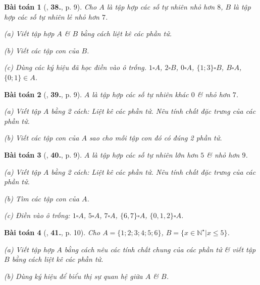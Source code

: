 \documentclass{article}
\numberwithin{equation}{section}
\newtheorem{baitoan}{Bài toán}[section]
\begin{document}
\begin{baitoan}[\cite{Trong_Toan_6_2021}, \textbf{38.}, p. 9]
	Cho $A$ là tập hợp các số tự nhiên nhỏ hơn $8$, $B$ là tập hợp các số tự nhiên lẻ nhỏ hơn $7$.
	\begin{enumerate*}
		\item[(a)] Viết tập hợp $A$ \& $B$ bằng cách liệt kê các phần tử.
		\item[(b)] Viết các tập con của $B$.
		\item[(c)] Dùng các ký hiệu đã học điền vào ô trống. $1\square A$, $2\square B$, $0\square A$, $\{1;3\}\square B$, $B\square A$, $\{0;1\}\in A$.
	\end{enumerate*}
\end{baitoan}

\begin{baitoan}[\cite{Trong_Toan_6_2021}, \textbf{39.}, p. 9]
	$A$ là tập hợp các số tự nhiên khác $0$ \& nhỏ hơn $7$.
	\begin{enumerate*}
		\item[(a)] Viết tập $A$ bằng 2 cách: Liệt kê các phần tử. Nêu tính chất đặc trưng của các phần tử.
		\item[(b)] Viết các tập con của $A$ sao cho mỗi tập con đó có đúng 2 phần tử.
	\end{enumerate*}
\end{baitoan}

\begin{baitoan}[\cite{Trong_Toan_6_2021}, \textbf{40.}, p. 9]
	$A$ là tập hợp các số tự nhiên lớn hơn $5$ \& nhỏ hơn $9$.
	\begin{enumerate*}
		\item[(a)] Viết tập $A$ bằng 2 cách: Liệt kê các phần tử. Nêu tính chất đặc trưng của các phần tử.
		\item[(b)] Tìm các tập con của $A$.
		\item[(c)] Điền vào ô trống: $1\square A$, $5\square A$, $7\square A$, $\{6,7\}\square A$, $\{0,1,2\}\square A$.
	\end{enumerate*}
\end{baitoan}

\begin{baitoan}[\cite{Trong_Toan_6_2021}, \textbf{41.}, p. 10]
	Cho $A = \{1;2;3;4;5;6\}$, $B = \{x\in\mathbb{N}^\star|x\le 5\}$.
	\begin{enumerate*}
		\item[(a)] Viết tập hợp $A$ bằng cách nêu các tính chất chung của các phần tử \& viết tập $B$ bằng cách liệt kê các phần tử.
		\item[(b)] Dùng ký hiệu để biểu thị sự quan hệ giữa $A$ \& $B$.
	\end{enumerate*}
\end{baitoan}
\end{document}
